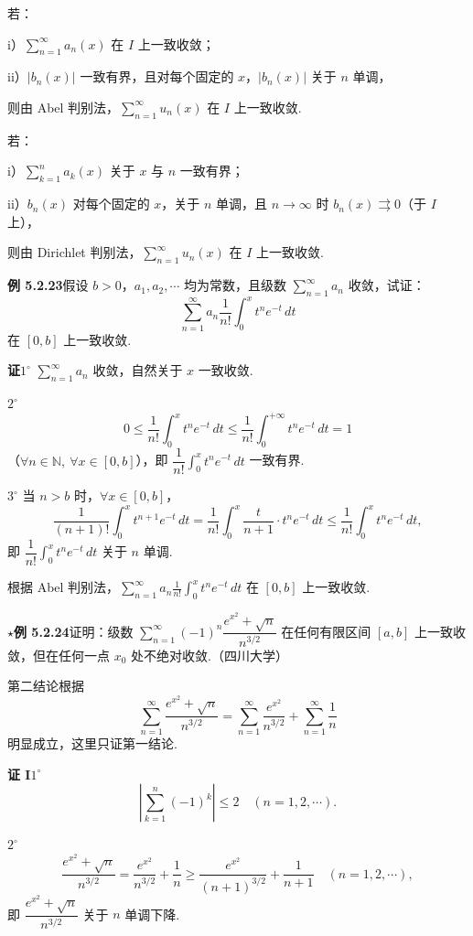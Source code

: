 \documentclass[UTF8, 12pt, fontset=fandol, oneside]{ctexart}
\begin{document}
若：

i）$\displaystyle\sum_{n=1}^{\infty}a_n(x)$ 在 $I$ 上一致收敛；

ii）$|b_n(x)|$ 一致有界，且对每个固定的 $x$，$|b_n(x)|$ 关于 $n$ 单调，

则由 Abel 判别法，$\displaystyle\sum_{n=1}^{\infty}u_n(x)$ 在 $I$ 上一致收敛.

若：

i）$\displaystyle\sum_{k=1}^{n}a_k(x)$ 关于 $x$ 与 $n$ 一致有界；

ii）$b_n(x)$ 对每个固定的 $x$，关于 $n$ 单调，且 $n\to\infty$ 时 $b_n(x)\rightrightarrows0$（于 $I$ 上），

则由 Dirichlet 判别法，$\displaystyle\sum_{n=1}^{\infty}u_n(x)$ 在 $I$ 上一致收敛.

\noindent\textbf{例 5.2.23}\quad 假设 $b>0$，$a_1,a_2,\cdots$ 均为常数，且级数
$\displaystyle\sum_{n=1}^{\infty}a_n$ 收敛，试证：
\[
  \sum_{n=1}^{\infty}a_n\frac1{n!}\int_0^x t^ne^{-t}\,dt
\]
在 $[0,b]$ 上一致收敛.

\noindent\textbf{证}\quad $1^\circ$ $\displaystyle\sum_{n=1}^{\infty}a_n$ 收敛，自然关于 $x$ 一致收敛.

$2^\circ$
\[
  0\le\frac1{n!}\int_0^x t^ne^{-t}\,dt
  \le\frac1{n!}\int_0^{+\infty}t^ne^{-t}\,dt=1
\]
（$\forall n\in\mathbb N,\ \forall x\in[0,b]$），即
$\dfrac1{n!}\displaystyle\int_0^x t^ne^{-t}\,dt$ 一致有界.

$3^\circ$ 当 $n>b$ 时，$\forall x\in[0,b]$，
\[
  \frac1{(n+1)!}\int_0^x t^{n+1}e^{-t}\,dt
  =\frac1{n!}\int_0^x\frac{t}{n+1}\cdot t^ne^{-t}\,dt
  \le\frac1{n!}\int_0^x t^ne^{-t}\,dt,
\]
即 $\dfrac1{n!}\displaystyle\int_0^x t^ne^{-t}\,dt$ 关于 $n$ 单调.

根据 Abel 判别法，$\displaystyle\sum_{n=1}^{\infty}a_n\frac1{n!}\int_0^x t^ne^{-t}\,dt$
在 $[0,b]$ 上一致收敛.

\noindent\textbf{$\star$例 5.2.24}\quad 证明：级数
$\displaystyle\sum_{n=1}^{\infty}(-1)^n\dfrac{e^{x^2}+\sqrt n}{n^{3/2}}$
在任何有限区间 $[a,b]$ 上一致收敛，但在任何一点 $x_0$ 处不绝对收敛.（四川大学）

第二结论根据
\[
  \sum_{n=1}^{\infty}\frac{e^{x^2}+\sqrt n}{n^{3/2}}
  =\sum_{n=1}^{\infty}\frac{e^{x^2}}{n^{3/2}}+\sum_{n=1}^{\infty}\frac1n
\]
明显成立，这里只证第一结论.

\noindent\textbf{证 I}\quad $1^\circ$
\[
  \left|\sum_{k=1}^{n}(-1)^k\right|\le2\quad(n=1,2,\cdots).
\]

$2^\circ$
\[
  \frac{e^{x^2}+\sqrt n}{n^{3/2}}
  =\frac{e^{x^2}}{n^{3/2}}+\frac1n
  \ge\frac{e^{x^2}}{(n+1)^{3/2}}+\frac1{n+1}\quad(n=1,2,\cdots),
\]
即 $\dfrac{e^{x^2}+\sqrt n}{n^{3/2}}$ 关于 $n$ 单调下降.
\end{document}
